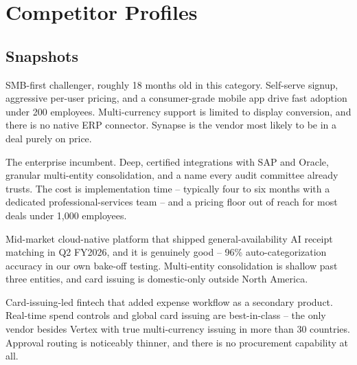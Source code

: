 \section{Competitor Profiles}

\subsection{Snapshots}

\begin{minipage}[t]{0.485\linewidth}
\begin{tcolorbox}[notebox, title={\faBolt\ Synapse}]
\footnotesize
SMB-first challenger, roughly 18 months old in this category. Self-serve signup, aggressive
per-user pricing, and a consumer-grade mobile app drive fast adoption under 200 employees.
Multi-currency support is limited to display conversion, and there is no native ERP connector.
Synapse is the vendor most likely to be in a deal purely on price.
\end{tcolorbox}
\end{minipage}\hfill
\begin{minipage}[t]{0.485\linewidth}
\begin{tcolorbox}[notebox, title={\faBuilding\ Vertex}]
\footnotesize
The enterprise incumbent. Deep, certified integrations with SAP and Oracle, granular
multi-entity consolidation, and a name every audit committee already trusts. The cost is
implementation time -- typically four to six months with a dedicated professional-services
team -- and a pricing floor out of reach for most deals under 1,000 employees.
\end{tcolorbox}
\end{minipage}
\par
\vspace{4pt}

\begin{minipage}[t]{0.485\linewidth}
\begin{tcolorbox}[notebox, title={\faBolt\ Nimbus}]
\footnotesize
Mid-market cloud-native platform that shipped general-availability AI receipt matching in
Q2 FY2026, and it is genuinely good -- 96\% auto-categorization accuracy in our own bake-off
testing. Multi-entity consolidation is shallow past three entities, and card issuing is
domestic-only outside North America.
\end{tcolorbox}
\end{minipage}\hfill
\begin{minipage}[t]{0.485\linewidth}
\begin{tcolorbox}[notebox, title={\faCreditCard\ Apex}]
\footnotesize
Card-issuing-led fintech that added expense workflow as a secondary product. Real-time spend
controls and global card issuing are best-in-class -- the only vendor besides Vertex with true
multi-currency issuing in more than 30 countries. Approval routing is noticeably thinner, and
there is no procurement capability at all.
\end{tcolorbox}
\end{minipage}
\par
\vspace{4pt}

